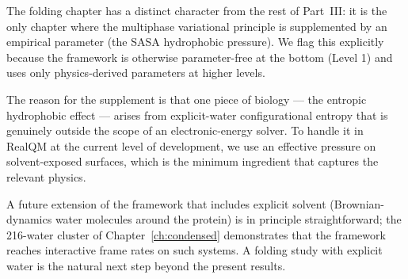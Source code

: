 The folding chapter has a distinct character from the rest of Part~III: it is the only chapter where the multiphase variational principle is supplemented by an empirical parameter (the SASA hydrophobic pressure). We flag this explicitly because the framework is otherwise parameter-free at the bottom (Level 1) and uses only physics-derived parameters at higher levels.

The reason for the supplement is that one piece of biology --- the entropic hydrophobic effect --- arises from explicit-water configurational entropy that is genuinely outside the scope of an electronic-energy solver. To handle it in RealQM at the current level of development, we use an effective pressure on solvent-exposed surfaces, which is the minimum ingredient that captures the relevant physics.

A future extension of the framework that includes explicit solvent (Brownian-dynamics water molecules around the protein) is in principle straightforward; the 216-water cluster of Chapter~\ref{ch:condensed} demonstrates that the framework reaches interactive frame rates on such systems. A folding study with explicit water is the natural next step beyond the present results.

